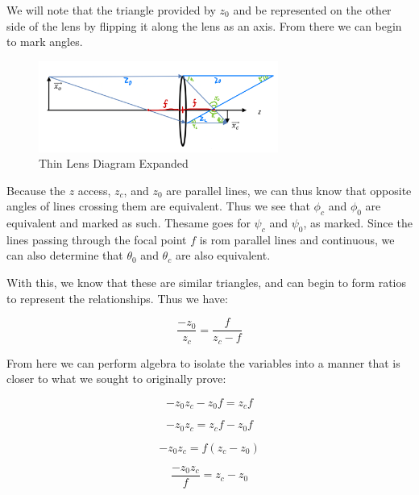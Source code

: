 \documentclass{article}
\begin{document}
We will note that the triangle provided by $z_0$ and be represented on the other side of the lens by flipping it along the lens as an axis. From there we can begin to mark angles.

\begin{figure}[H]
    \centering
    \includegraphics[width = 0.7\textwidth]{imgs/prob_3_expanded.png}
    \caption{Thin Lens Diagram Expanded}
    \label{fig:prob1_expanded}
\end{figure}

Because the $z$ access, $z_c$, and $z_0$ are parallel lines, we can thus know that opposite angles of lines crossing them are equivalent. Thus we see that $\phi_c$ and $\phi_0$ are equivalent and marked as such. Thesame goes for $\psi_c$ and $\psi_0$, as marked.  Since the lines passing through the focal point $f$ is rom parallel lines and continuous, we can also determine that $\theta_0$ and $\theta_c$ are also equivalent.

With this, we know that these are similar triangles, and can begin to form ratios to represent the relationships. Thus we have:

\begin{equation}
    \frac{-z_0}{z_c} = \frac{f}{z_c - f}
\end{equation}

From here we can perform algebra to isolate the variables into a manner that is closer to what we sought to originally prove:

\begin{equation}
    -z_0 z_c - z_0 f = z_c f
\end{equation}

\begin {equation}
    -z_0 z_c = z_c f - z_0 f
\end{equation}

\begin{equation}
    -z_0 z_c = f (z_c - z_0)
\end{equation}

\begin{equation}
    \frac{-z_0 z_c}{f} = z_c - z_0
\end{equation}
\end{document}
